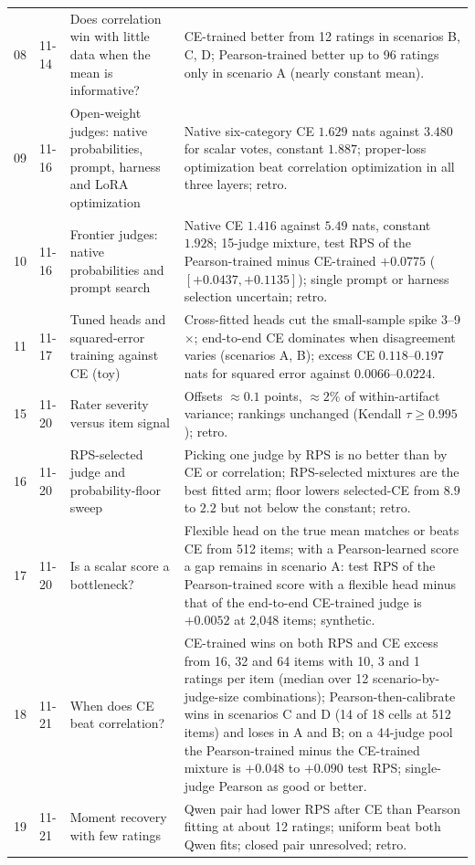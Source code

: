 {\begin{longtable}{@{}p{}p{}p{}p{}@{}}
08 & 11-14 & Does correlation win with little data when the mean is informative? & CE-trained better from 12 ratings in scenarios B, C, D; Pearson-trained better up to 96 ratings only in scenario A (nearly constant mean). \\
09 & 11-16 & Open-weight judges: native probabilities, prompt, harness and LoRA optimization & Native six-category CE $1.629$ nats against $3.480$ for scalar votes, constant $1.887$; proper-loss optimization beat correlation optimization in all three layers; retro. \\
10 & 11-16 & Frontier judges: native probabilities and prompt search & Native CE $1.416$ against $5.49$ nats, constant $1.928$; 15-judge mixture, test RPS of the Pearson-trained minus CE-trained $+0.0775$ ($[+0.0437,+0.1135]$); single prompt or harness selection uncertain; retro. \\
11 & 11-17 & Tuned heads and squared-error training against CE (toy) & Cross-fitted heads cut the small-sample spike 3--9$\times$; end-to-end CE dominates when disagreement varies (scenarios A, B); excess CE $0.118$--$0.197$ nats for squared error against $0.0066$--$0.0224$. \\
15 & 11-20 & Rater severity versus item signal & Offsets $\approx0.1$ points, $\approx2\%$ of within-artifact variance; rankings unchanged (Kendall $\tau\ge0.995$); retro. \\
16 & 11-20 & RPS-selected judge and probability-floor sweep & Picking one judge by RPS is no better than by CE or correlation; RPS-selected mixtures are the best fitted arm; floor lowers selected-CE from $8.9$ to $2.2$ but not below the constant; retro. \\
17 & 11-20 & Is a scalar score a bottleneck? & Flexible head on the true mean matches or beats CE from 512 items; with a Pearson-learned score a gap remains in scenario A: test RPS of the Pearson-trained score with a flexible head minus that of the end-to-end CE-trained judge is $+0.0052$ at 2{,}048 items; synthetic. \\
18 & 11-21 & When does CE beat correlation? & CE-trained wins on both RPS and CE excess from 16, 32 and 64 items with 10, 3 and 1 ratings per item (median over 12 scenario-by-judge-size combinations); Pearson-then-calibrate wins in scenarios C and D (14 of 18 cells at 512 items) and loses in A and B; on a 44-judge pool the Pearson-trained minus the CE-trained mixture is $+0.048$ to $+0.090$ test RPS; single-judge Pearson as good or better. \\
19 & 11-21 & Moment recovery with few ratings & Qwen pair had lower RPS after CE than Pearson fitting at about 12 ratings; uniform beat both Qwen fits; closed pair unresolved; retro. \\

\end{longtable}}
